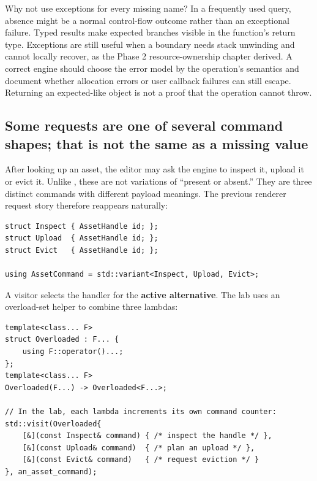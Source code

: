 Why not use exceptions for every missing name? In a frequently used query, absence might be a normal control-flow outcome rather than an exceptional failure. Typed results make expected branches visible in the function's return type. Exceptions are still useful when a boundary needs stack unwinding and cannot locally recover, as the Phase 2 resource-ownership chapter derived. A correct engine should choose the error model by the operation's semantics and document whether allocation errors or user callback failures can still escape. Returning an expected-like object is not a proof that the operation cannot throw.

\subsection{Some requests are one of several command shapes; that is not the same as a missing value}\label{01-foundations-i-ch006-some-requests-are-one-of-several-command-shapes-that-is-not-the-same-as-a-missing-value}

\hypertarget{01-foundations-i-ch006-some-requests-are-one-of-several-command-shapes-that-is-not-the-same-as-a-missing-value}{}

After looking up an asset, the editor may ask the engine to inspect it, upload it or evict it. Unlike , these are not variations of ``present or absent.'' They are three distinct commands with different payload meanings. The previous renderer request story therefore reappears naturally:

\begin{verbatim}
struct Inspect { AssetHandle id; };
struct Upload  { AssetHandle id; };
struct Evict   { AssetHandle id; };

using AssetCommand = std::variant<Inspect, Upload, Evict>;
\end{verbatim}

A visitor selects the handler for the \textbf{active alternative}. The lab uses an overload-set helper to combine three lambdas:

\begin{verbatim}
template<class... F>
struct Overloaded : F... {
    using F::operator()...;
};
template<class... F>
Overloaded(F...) -> Overloaded<F...>;

// In the lab, each lambda increments its own command counter:
std::visit(Overloaded{
    [&](const Inspect& command) { /* inspect the handle */ },
    [&](const Upload& command)  { /* plan an upload */ },
    [&](const Evict& command)   { /* request eviction */ }
}, an_asset_command);
\end{verbatim}

